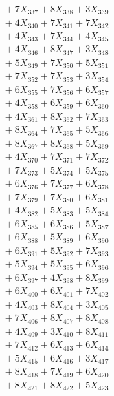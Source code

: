 \documentclass[a4paper,10pt]{article}
\begin{document}
{\begin{align}
&\;  + 7 X_{337} + 8 X_{338} + 3 X_{339} \\[0.5ex]\allowbreak
&\;  + 4 X_{340} + 7 X_{341} + 7 X_{342} \\[0.3ex]
&\;  + 4 X_{343} + 7 X_{344} + 4 X_{345} \\[0.3ex]
&\;  + 4 X_{346} + 8 X_{347} + 3 X_{348} \\[0.3ex]
&\;  + 5 X_{349} + 7 X_{350} + 5 X_{351} \\[0.3ex]
&\;  + 7 X_{352} + 7 X_{353} + 3 X_{354} \\[0.3ex]
&\;  + 6 X_{355} + 7 X_{356} + 6 X_{357} \\[0.3ex]
&\;  + 4 X_{358} + 6 X_{359} + 6 X_{360} \\[0.3ex]
&\;  + 4 X_{361} + 8 X_{362} + 7 X_{363} \\[0.3ex]
&\;  + 8 X_{364} + 7 X_{365} + 5 X_{366} \\[0.3ex]
&\;  + 8 X_{367} + 8 X_{368} + 5 X_{369} \\[0.5ex]\allowbreak
&\;  + 4 X_{370} + 7 X_{371} + 7 X_{372} \\[0.3ex]
&\;  + 7 X_{373} + 5 X_{374} + 5 X_{375} \\[0.3ex]
&\;  + 6 X_{376} + 7 X_{377} + 6 X_{378} \\[0.3ex]
&\;  + 7 X_{379} + 7 X_{380} + 6 X_{381} \\[0.3ex]
&\;  + 4 X_{382} + 5 X_{383} + 5 X_{384} \\[0.3ex]
&\;  + 6 X_{385} + 6 X_{386} + 5 X_{387} \\[0.3ex]
&\;  + 6 X_{388} + 5 X_{389} + 6 X_{390} \\[0.3ex]
&\;  + 6 X_{391} + 5 X_{392} + 7 X_{393} \\[0.3ex]
&\;  + 5 X_{394} + 5 X_{395} + 6 X_{396} \\[0.3ex]
&\;  + 6 X_{397} + 4 X_{398} + 8 X_{399} \\[0.5ex]\allowbreak
&\;  + 6 X_{400} + 6 X_{401} + 7 X_{402} \\[0.3ex]
&\;  + 4 X_{403} + 8 X_{404} + 3 X_{405} \\[0.3ex]
&\;  + 7 X_{406} + 8 X_{407} + 8 X_{408} \\[0.3ex]
&\;  + 4 X_{409} + 3 X_{410} + 8 X_{411} \\[0.3ex]
&\;  + 7 X_{412} + 6 X_{413} + 6 X_{414} \\[0.3ex]
&\;  + 5 X_{415} + 6 X_{416} + 3 X_{417} \\[0.3ex]
&\;  + 8 X_{418} + 7 X_{419} + 6 X_{420} \\[0.3ex]
&\;  + 8 X_{421} + 8 X_{422} + 5 X_{423} \\[0.3ex]

\end{align}}
\end{document}
